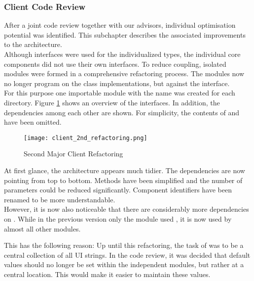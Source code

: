 \subsubsection{Client Code Review}
After a joint code review together with our advisors, individual optimisation potential was identified.
This subchapter describes the associated improvements to the architecture. \\

Although interfaces were used for the individualized types,
the individual core components did not use their own interfaces.
To reduce coupling, isolated modules were formed in a comprehensive refactoring process.
The modules now no longer program on the class implementations, but against the interface. \\

For this purpose one importable module with the name  was created for each directory.
Figure \ref{fig:client_2nd_refactoring} shows an overview of the interfaces.
In addition, the dependencies among each other are shown.
For simplicity, the contents of  and  have been omitted. \\

\begin{figure}[H]
    \centering
    \texttt{[image: client\_2nd\_refactoring.png]}
    \caption{Second Major Client Refactoring}
    \label{fig:client_2nd_refactoring}
\end{figure}

At first glance, the architecture appears much tidier.
The dependencies are now pointing from top to bottom.
Methods have been simplified and the number of parameters could be reduced significantly.
Component identifiers have been renamed to be more understandable. \\

However, it is now also noticeable that there are considerably more dependencies on .
While in the previous version only the module  used , it is now used by almost all other modules.

This has the following reason: Up until this refactoring, the task of  was to be a central collection of all UI strings. 
In the code review, it was decided that default values should no longer be set within the independent modules,
but rather at a central location.
This would make it easier to maintain these values. \\



